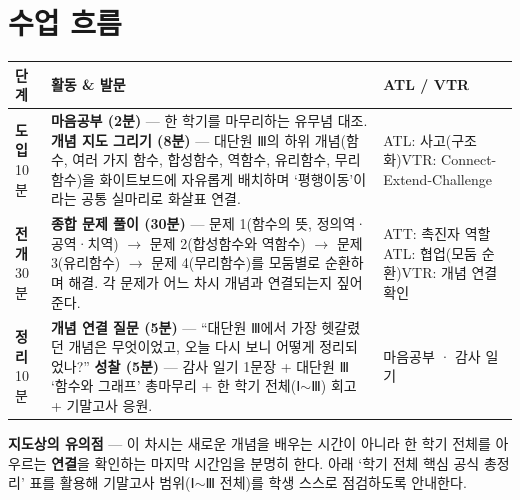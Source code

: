 \documentclass[11pt,a4paper]{article}
\begin{document}
\section{수업 흐름}
\begin{tabularx}{\linewidth}{@{}>{\centering\arraybackslash}p{1.6cm}X>{\raggedright\arraybackslash\small}p{3.1cm}@{}}
\toprule
\textbf{단계} & \textbf{활동 \& 발문} & \textbf{ATL / VTR} \\
\midrule
\textcolor{goldstrong}{\textbf{도입}}\newline\footnotesize 10분 &
\textbf{마음공부 (2분)} --- 한 학기를 마무리하는 유무념 대조.\newline
\textbf{개념 지도 그리기 (8분)} --- 대단원 Ⅲ의 하위 개념(함수, 여러 가지 함수, 합성함수, 역함수, 유리함수, 무리함수)을 화이트보드에 자유롭게 배치하며 `평행이동'이라는 공통 실마리로 화살표 연결. &
ATL: 사고(구조화)\newline VTR: Connect-Extend-Challenge \\
\addlinespace
\textcolor{goldstrong}{\textbf{전개}}\newline\footnotesize 30분 &
\textbf{종합 문제 풀이 (30분)} --- 문제 1(함수의 뜻, 정의역·공역·치역) $\to$ 문제 2(합성함수와 역함수) $\to$ 문제 3(유리함수) $\to$ 문제 4(무리함수)를 모둠별로 순환하며 해결. 각 문제가 어느 차시 개념과 연결되는지 짚어 준다. &
ATT: 촉진자 역할\newline ATL: 협업(모둠 순환)\newline VTR: 개념 연결 확인 \\
\addlinespace
\textcolor{goldstrong}{\textbf{정리}}\newline\footnotesize 10분 &
\textbf{개념 연결 질문 (5분)} --- ``대단원 Ⅲ에서 가장 헷갈렸던 개념은 무엇이었고, 오늘 다시 보니 어떻게 정리되었나?''\newline
\textbf{성찰 (5분)} --- 감사 일기 1문장 + 대단원 Ⅲ `함수와 그래프' 총마무리 + 한 학기 전체(Ⅰ$\sim$Ⅲ) 회고 + 기말고사 응원. &
마음공부 · 감사 일기 \\
\bottomrule
\end{tabularx}

\begin{calloutbox}
\textbf{지도상의 유의점} --- 이 차시는 새로운 개념을 배우는 시간이 아니라 한 학기 전체를 아우르는 \textbf{연결}을 확인하는 마지막 시간임을 분명히 한다. 아래 `학기 전체 핵심 공식 총정리' 표를 활용해 기말고사 범위(Ⅰ$\sim$Ⅲ 전체)를 학생 스스로 점검하도록 안내한다.
\end{calloutbox}
\end{document}
